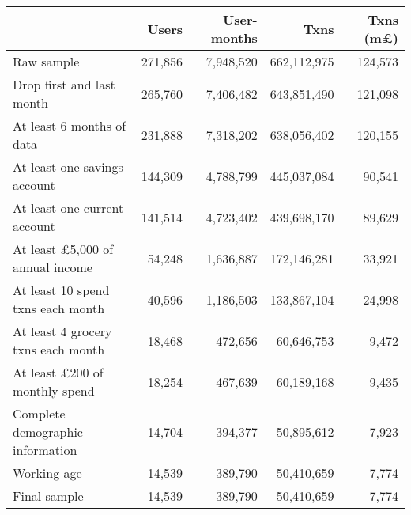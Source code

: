 \begin{tabular}{lrrrr}
\toprule
                                       &   Users & User-months &        Txns & Txns (m\pounds) \\
\midrule
                            Raw sample & 271,856 &   7,948,520 & 662,112,975 &         124,573 \\
             Drop first and last month & 265,760 &   7,406,482 & 643,851,490 &         121,098 \\
             At least 6 months of data & 231,888 &   7,318,202 & 638,056,402 &         120,155 \\
          At least one savings account & 144,309 &   4,788,799 & 445,037,084 &          90,541 \\
          At least one current account & 141,514 &   4,723,402 & 439,698,170 &          89,629 \\
At least \pounds5,000 of annual income &  54,248 &   1,636,887 & 172,146,281 &          33,921 \\
     At least 10 spend txns each month &  40,596 &   1,186,503 & 133,867,104 &          24,998 \\
    At least 4 grocery txns each month &  18,468 &     472,656 &  60,646,753 &           9,472 \\
  At least \pounds200 of monthly spend &  18,254 &     467,639 &  60,189,168 &           9,435 \\
      Complete demographic information &  14,704 &     394,377 &  50,895,612 &           7,923 \\
                           Working age &  14,539 &     389,790 &  50,410,659 &           7,774 \\
                          Final sample &  14,539 &     389,790 &  50,410,659 &           7,774 \\
\bottomrule
\end{tabular}
